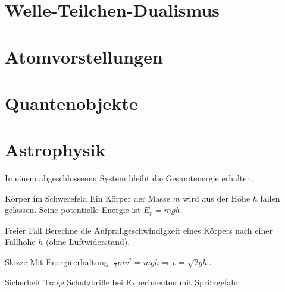 \documentclass[11pt,a4paper,oneside]{article}
\begin{document}
	\section{Welle-Teilchen-Dualismus}
	\section{Atomvorstellungen}
	
	
	\section{Quantenobjekte}
	\section{Astrophysik}
	
	
	\newpage
	
	
	
	
	
	
	\newpage
	
	
	
	
	
	\begin{theo}
		In einem abgeschlossenen System bleibt die Gesamtenergie erhalten.
	\end{theo}
	
	\begin{exem}{Körper im Schwerefeld}
		Ein Körper der Masse $m$ wird aus der Höhe $h$ fallen gelassen. Seine potentielle Energie ist $E_p = mgh$.
	\end{exem}
	
	\begin{aufgabe}{Freier Fall}
		Berechne die Aufprallgeschwindigkeit eines Körpers nach einer Fallhöhe $h$ (ohne Luftwiderstand).
	\end{aufgabe}
	
	\begin{loesung}{Skizze}
		Mit Energieerhaltung: $\frac12 mv^2 = mgh \Rightarrow v=\sqrt{2gh}$.
	\end{loesung}
	
	\begin{infobox}{Sicherheit}
		Trage Schutzbrille bei Experimenten mit Spritzgefahr.
	\end{infobox}
	
\end{document}
